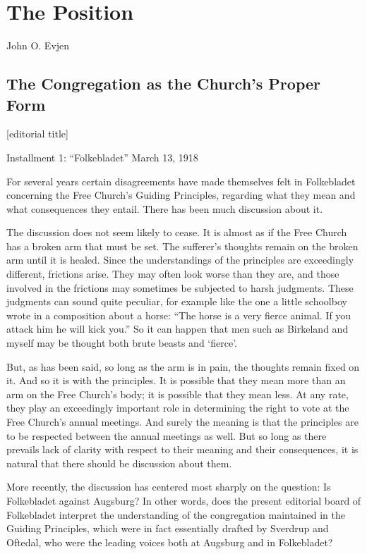 
\section{The Position}

John  O. Evjen


\subsection{The Congregation as the Church’s Proper Form}

[editorial title]

Installment 1: “Folkebladet” March 13, 1918

For several years certain disagreements have made themselves felt in Folkebladet concerning the Free Church’s Guiding Principles, regarding what they mean and what consequences they entail. There has been much discussion about it.

The discussion does not seem likely to cease. It is almost as if the Free Church has a broken arm that must be set. The sufferer’s thoughts remain on the broken arm until it is healed. Since the understandings of the principles are exceedingly different, frictions arise. They may often look worse than they are, and those involved in the frictions may sometimes be subjected to harsh judgments. These judgments can sound quite peculiar, for example like the one a little schoolboy wrote in a composition about a horse: “The horse is a very fierce animal. If you attack him he will kick you.” So it can happen that men such as Birkeland and myself may be thought both brute beasts and ‘fierce’.

But, as has been said, so long as the arm is in pain, the thoughts remain fixed on it. And so it is with the principles. It is possible that they mean more than an arm on the Free Church’s body; it is possible that they mean less. At any rate, they play an exceedingly important role in determining the right to vote at the Free Church’s annual meetings. And surely the meaning is that the principles are to be respected between the annual meetings as well. But so long as there prevails lack of clarity with respect to their meaning and their consequences, it is natural that there should be discussion about them.

More recently, the discussion has centered most sharply on the question: Is Folkebladet against Augsburg? In other words, does the present editorial board of Folkebladet interpret the understanding of the congregation maintained in the Guiding Principles, which were in fact essentially drafted by Sverdrup and Oftedal, who were the leading voices both at Augsburg and in Folkebladet?

